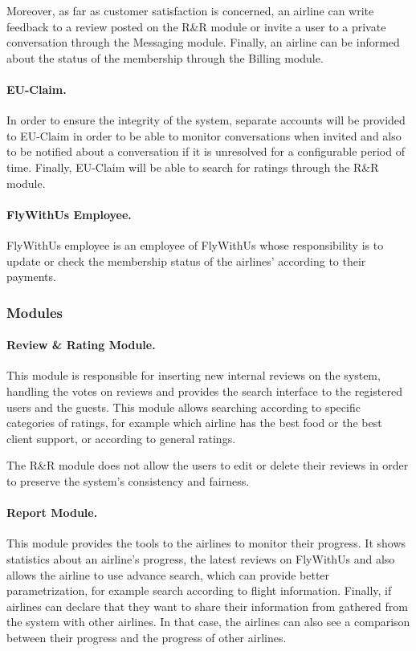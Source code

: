 Moreover, as far as customer satisfaction is concerned, an airline can write feedback to a review posted on the R\&R module or invite a user to a private conversation through the Messaging module. Finally, an airline can be informed about the status of the membership through the Billing module.

\paragraph{EU-Claim.} In order to ensure the integrity of the system, separate accounts will be provided to EU-Claim in order to be able to  monitor conversations when invited and also to be notified about a conversation if it is unresolved for a configurable period of time. Finally, EU-Claim will be able to search for ratings through the R\&R module.

\paragraph{FlyWithUs Employee.} FlyWithUs employee is an employee of FlyWithUs whose responsibility is to update or check the membership status of the airlines' according to their payments.

\subsubsection{Modules}
\paragraph{Review \& Rating Module.} This module is responsible for inserting new internal reviews on the system, handling the votes on reviews and provides the search interface to the registered users and the guests. This module allows searching according to specific categories of ratings, for example which airline has the best food or the best client support, or according to general ratings. 

The R\&R module does not allow the users to  edit or delete their reviews in order to preserve the system's consistency and fairness.

\paragraph{Report Module.} This module provides the tools to the airlines to monitor their progress. It shows statistics about an airline's progress, the latest reviews on FlyWithUs and also allows the airline to use advance search, which can provide better parametrization, for example search according to flight information. Finally, if airlines can declare that they want to share their information from gathered from the system with other airlines. In that case, the airlines can also see a comparison between their progress and the progress of other airlines.

